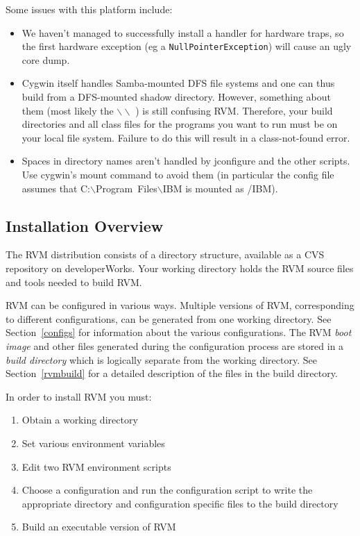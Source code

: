 Some issues with this platform include:

\begin{itemize}
\item We haven't managed to successfully install a handler for hardware traps,
so the first hardware exception (eg a {\tt NullPointerException}) will cause
an ugly core dump.
\item Cygwin itself handles Samba-mounted DFS file
systems and one can thus build from a DFS-mounted shadow
directory. However, something about them (most likely the 
$\backslash\backslash$ ) is
still confusing RVM.  Therefore, your build directories and all class
files for the programs you want to run must be on your local file
system. Failure to do this will result in a class-not-found error.
\item Spaces in directory names aren't handled by jconfigure and the
other scripts.  Use cygwin's mount command to avoid them (in
particular the config file assumes that
C:$\backslash$Program~Files$\backslash$IBM is mounted as /IBM).
\end{itemize}


\subsection{Installation Overview}
The RVM distribution consists of a directory structure, available as
a CVS repository on developerWorks.
Your working directory holds the RVM 
source files and tools needed to build RVM. 

RVM can be configured in various ways. Multiple versions of RVM,
corresponding to different configurations, can be generated from 
one working directory. See Section~\ref{configs} for information about the 
various 
configurations.
The RVM  {\em boot image} and other files generated during the 
configuration process
are stored in a {\em build directory} which is logically separate from 
the working directory. See Section~\ref{rvmbuild} for a detailed description 
of the files in the build directory.

In order to install RVM  you must:
\begin{enumerate}
\item Obtain a working directory 
\item Set various environment variables
\item Edit two RVM environment scripts
\item Choose a configuration and run the configuration script to write
the appropriate directory and configuration specific files to the
build directory
\item Build an executable version of RVM
\end{enumerate}


